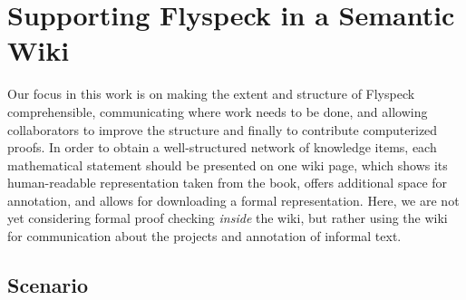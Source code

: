 
\section{Supporting Flyspeck in a Semantic Wiki}

Our focus in this work is on making the extent and structure of Flyspeck
comprehensible, communicating where work needs to be done, and allowing
collaborators to improve the structure and finally to contribute computerized
proofs.    In order to obtain a well-structured network of knowledge items, each
mathematical statement should be presented on one wiki page, which shows its
human-readable representation taken from the book, offers additional space for
annotation, and allows for downloading a formal representation.  Here, we are
not yet considering formal proof checking \emph{inside} the wiki, but rather
using the wiki for communication about the projects and annotation of informal
text.



\subsection{Scenario}


